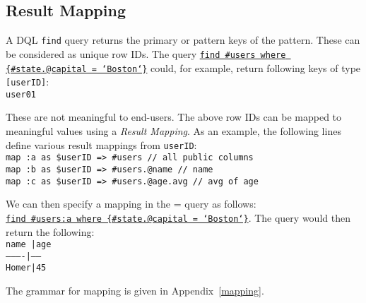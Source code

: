 \subsection{Result Mapping}

A DQL \texttt{find} query returns the primary or pattern keys of the pattern. These can be considered as unique row IDs. The query \texttt{\small \underline{find \#users where \{\#state.@capital = `Boston`\}}} could, for example, return following keys of type \texttt{[userID]}:\\
{\small
	\texttt{\phantom{~}user01}%
}

These are not meaningful to end-users. The above row IDs can be mapped to meaningful values using a {\em Result Mapping}. %
As an example, the following lines define various result mappings from \texttt{userID}:\\
{\small
	\texttt{\phantom{~}map :a as \$userID => \#users // all public columns} \\
	\texttt{\phantom{~}map :b as \$userID => \#users.@name // name}\\
	\texttt{\phantom{~}map :c as \$userID => \#users.@age.avg // avg of age}
}

We can then specify a mapping in the = query as follows:\\ 
\texttt{\small \underline{find \#users:a where \{\#state.@capital = `Boston`\}}}. The query would then return the following:\\
{\small
	\texttt{\phantom{~}name |age}\\
	\texttt{\phantom{~}----------|------}\\
	\texttt{\phantom{~}Homer|45 }%
}

The grammar for mapping is given in Appendix~\ref{mapping}.
%

